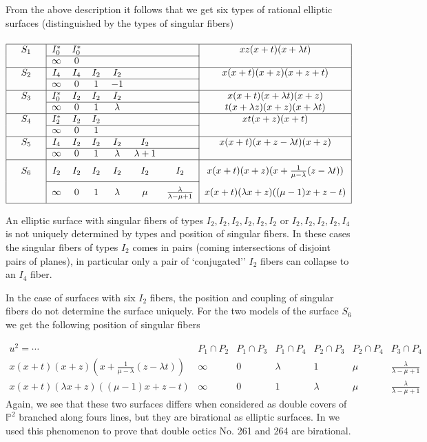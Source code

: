 \documentclass[12pt]{amsart}
\theoremstyle{plain}
\theoremstyle{remark}
\theoremstyle{definition}
\newcommand{\PP}{\mathbb P}
\numberwithin{table}{section}
\begin{document}
From the above description it follows that we get six types of rational elliptic surfaces (distinguished by the types of singular fibers)
\[
\def\arraycolsep{2mm}
\begin{array}[t]{|c|cccccc|c|}
	\hline
	\def\multicolumn#1#2{}
	\quad S_{1} \quad&I_{0}^{*}&I_{0}^{*}&&&&&{xz(x+t)(x+\lambda t)}\\
	\cline{2-7}
	&\infty&0&&&&&\\
	\hline
	S_{2}&I_{4}&I_{4}&I_{2}&I_{2}&&&{x(x+t)(x+z)(x+z+t)}\\
	\cline{2-7}
	&\infty&0&1&-1&&&\\
	\hline
	S_{3}&I_{0}^{*}&I_{2}&I_{2}&I_{2}&&&{x(x+t)(x+\lambda t)(x+z)}\\
	\cline{2-7}
	&\infty&0&1&\lambda&&&{t(x+\lambda z)(x+z)(x+\lambda t)}\\
	\hline
	S_{4}&I_{2}^{*}&I_{2}&I_{2}&&&&{xt(x+z)(x+t)}\\
	\cline{2-7}
	&\infty&0&1&&&&\\
	\hline
	S_{5}&I_{4}&I_{2}&I_{2}&I_{2}&I_{2}&&{x(x+t)(x+z-\lambda
		t)(x+z)}\\
	\cline{2-7}
	&\infty&0&1&\lambda&\lambda+1&&\\
	\hline
	S_{6}&I_{2}&I_{2}&I_{2}&I_{2}&I_{2}&I_{2}&{x(x+t)(x+z)(x+\frac{1}{\mu-\lambda}
		(z-\lambda t))}\rule[-3mm]{0pt}{8mm}\\
	\cline{2-7}
	&\infty&0&1&\lambda&\mu&\frac{\lambda}{\lambda-\mu+1}&
	x(x+t)(\lambda x+z)((\mu-1)x+z-t)\rule[-3mm]{0pt}{8mm}\\
	\hline
\end{array}
\]\vspace{2mm}

An elliptic surface with singular fibers of types $I_{2}, I_{2}, I_{2}, I_{2}, I_{2}, I_{2}$ or $I_{2}, I_{2}, I_{2}, I_{2}, I_{4}$ is not uniquely
determined by types and position of singular fibers.
In these cases the singular fibers of types $I_{2}$ comes in pairs (coming intersections of disjoint pairs of planes), in particular only a pair of `conjugated'' $I_{2}$ fibers can collapse to an $I_{4}$ fiber.

In the case of surfaces with six $I_{2}$ fibers, the position and coupling of singular fibers
do not determine the surface uniquely. For the two models of the surface $S_{6}$ we get the following position of singular fibers

\[
\begin{array}{c|c|c|c|c|c|c}
u^{2}=\cdots &P_{1}\cap P_{2}&  P_{1}\cap P_{3}&  P_{1}\cap P_{4}&  P_{2}\cap P_{3}&  P_{2}\cap P_{4}&  P_{3}\cap P_{4}\\\hline
 {x(x+t)(x+z)(x+\frac{1}{\mu-\lambda}
 	(z-\lambda t))}&\infty&0&\lambda&1&\mu&\frac\lambda{\lambda-\mu+1} \\\hline
x(x+t)(\lambda x+z)((\mu-1)x+z-t) &\infty&0&1&\lambda&\mu&\frac\lambda{\lambda-\mu+1}
\end{array}\]
Again, we see that these two surfaces differs when considered as double covers of $\PP^{2}$ branched along fours lines, but they are birational as elliptic surfaces. In \cite{CK-C} we used this phenomenon to prove that double octics No. 261 and 264 are birational.
\end{document}
